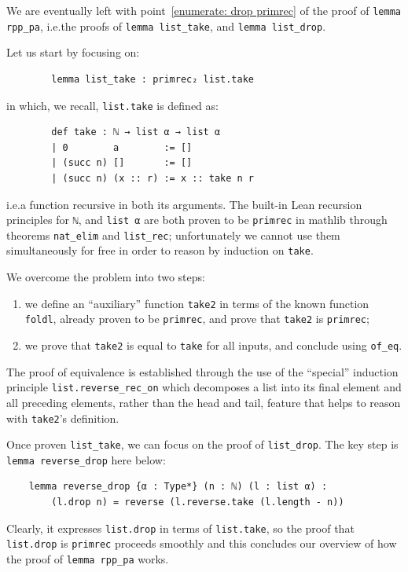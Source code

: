 \documentclass[preprint]{elsarticle}
\theoremstyle{remark}
\newcommand{\MATHLIB}{\textsf{mathlib}\xspace}
\newcommand{\LEAN}{\textsf{Lean}\xspace}
\begin{document}
We are eventually left with point~\ref{enumerate: drop primrec} of the proof of \lstinline|lemma rpp_pa|, i.e.\@ the proofs of \lstinline|lemma list_take|, and \lstinline|lemma list_drop|.

\vspace{\baselineskip}
\noindent
Let us start by focusing on:
\begin{lstlisting}
        lemma list_take : primrec₂ list.take
\end{lstlisting}
\noindent
in which, we recall, \lstinline|list.take| is defined as:
\begin{lstlisting}
        def take : ℕ → list α → list α
        | 0        a        := []
        | (succ n) []       := []
        | (succ n) (x :: r) := x :: take n r
\end{lstlisting}
\noindent
i.e.\@ a function recursive in both its arguments. The built-in \LEAN recursion principles for \lstinline|ℕ|, and \lstinline|list α| are both proven to be \lstinline|primrec| in \MATHLIB through theorems \lstinline|nat_elim| and \lstinline|list_rec|; unfortunately we cannot use them simultaneously for free in order to reason by induction on \lstinline|take|.

\vspace{\baselineskip}
\noindent
We overcome the problem into two steps:
\begin{enumerate}
    \item we define an ``auxiliary'' function \lstinline|take2| in terms of the known function \lstinline|foldl|, already proven to be \lstinline|primrec|, and prove that \lstinline|take2| is \lstinline|primrec|;
    \item we prove that \lstinline|take2| is equal to \lstinline|take| for all inputs, and conclude using \lstinline|of_eq|.
\end{enumerate}
The proof of equivalence is established through the use of the ``special'' induction principle \lstinline|list.reverse_rec_on| which decomposes a list into its final element and all preceding elements, rather than the head and tail, feature that helps to reason with \lstinline|take2|'s definition.

\vspace{\baselineskip}
\noindent
Once proven \lstinline|list_take|, we can focus on the proof of \lstinline|list_drop|.
The key step is \lstinline|lemma reverse_drop| here below:
\begin{lstlisting}
    lemma reverse_drop {α : Type*} (n : ℕ) (l : list α) :
        (l.drop n) = reverse (l.reverse.take (l.length - n))
\end{lstlisting}
\noindent
Clearly, it expresses \lstinline|list.drop| in terms of \lstinline|list.take|, so the proof that \lstinline|list.drop| is \lstinline|primrec| proceeds smoothly and this concludes our overview of how the proof of \lstinline|lemma rpp_pa| works.
\end{document}
